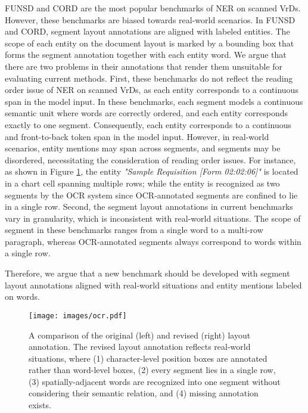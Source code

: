 \documentclass[11pt]{article}
\begin{document}
FUNSD \citep{jaume2019funsd} and CORD \citep{park2019cord} are the most popular benchmarks of NER on scanned VrDs. However, these benchmarks are biased towards real-world scenarios. In FUNSD and CORD, segment layout annotations are aligned with labeled entities. The scope of each entity on the document layout is marked by a bounding box that forms the segment annotation together with each entity word. 
We argue that there are two problems in their annotations that render them unsuitable for evaluating current methods.
First, these benchmarks do not reflect the reading order issue of NER on scanned VrDs, as each entity corresponds to a continuous span in the model input.
In these benchmarks, each segment models a continuous semantic unit where words are correctly ordered, and each entity corresponds exactly to one segment.
Consequently, each entity corresponds to a continuous and front-to-back token span in the model input. 
However, in real-world scenarios, entity mentions may span across segments, and segments may be disordered, necessitating the consideration of reading order issues.
For instance, as shown in Figure \ref{fig:ocr}, the entity {\footnotesize \textit{"Sample Requisition [Form 02:02:06]"}} is located in a chart cell spanning multiple rows; while the entity is recognized as two segments by the OCR system since OCR-annotated segments are confined to lie in a single row. 
Second, the segment layout annotations in current benchmarks vary in granularity, which is inconsistent with real-world situations. 
The scope of segment in these benchmarks ranges from a single word to a multi-row paragraph, whereas OCR-annotated segments always correspond to words within a single row. 

Therefore, we argue that a new benchmark should be developed with segment layout annotations aligned with real-world situations and entity mentions labeled on words. 

\begin{figure}[t]
    \centering
\texttt{[image: images/ocr.pdf]}        
    \caption{
        A comparison of the original (left) and revised (right) layout annotation. The revised layout annotation reflects real-world situations, where (1) character-level position boxes are annotated rather than word-level boxes, (2) every segment lies in a single row, (3) spatially-adjacent words are recognized into one segment without considering their semantic relation, and (4) missing annotation exists.}
\label{fig:ocr}
\end{figure}
\end{document}
